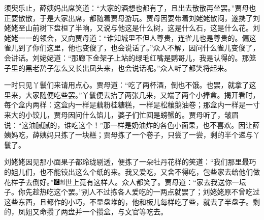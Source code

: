 须臾乐止，薛姨妈出席笑道：“大家的酒想也都有了，且出去散散再坐罢。”贾母也正要散散，于是大家出席，都随着贾母游玩。贾母因要带着刘姥姥散闷，遂携了刘姥姥至山前树下盘桓了半晌，又说与他这是什么树，这是什么石，这是什么花。刘姥姥一一的领会，又向贾母道：“谁知城里不但人尊贵，连雀儿也是尊贵的。偏这雀儿到了你们这里，他也变俊了，也会说话了。”众人不解，因问什么雀儿变俊了，会讲话。刘姥姥道：“那廊下金架子上站的绿毛红嘴是鹦哥儿，我是认得的。那笼子里的黑老鸹子怎么又长出凤头来，也会说话呢。”众人听了都笑将起来。

一时只见丫鬟们来请用点心。贾母道：“吃了两杯酒，倒也不饿。也罢，就拿了这里来，大家随便吃些罢。”丫鬟便去抬了两张几来，又端了两个小捧盒。揭开看时，每个盒内两样：这盒内一样是藕粉桂糖糕，一样是松穰鹅油卷；那盒内一样是一寸来大的小饺儿，贾母因问什么馅儿，婆子们忙回是螃蟹的。贾母听了，皱眉说：“这油腻腻的，谁吃这个！”那一样是奶油炸的各色小面果，也不喜欢。因让薛姨妈吃，薛姨妈只拣了一块糕；贾母拣了一个卷子，只尝了一尝，剩的半个递与丫鬟了。

刘姥姥因见那小面果子都玲珑剔透，便拣了一朵牡丹花样的笑道：“我们那里最巧的姐儿们，也不能铰出这么个纸的来。我又爱吃，又舍不得吃，包些家去给他们做花样子去倒好。”{\includegraphics[width=3mm]{../Images/00006}\includegraphics[width=3mm]{../Images/00011}\footnotesize \kaishu 世上竟有这样人。}众人都笑了。贾母道：“家去我送你一坛子。你先趁热吃这个罢。”别人不过拣各人爱吃的一两点就罢了；刘姥姥原不曾吃过这些东西，且都作的小巧，不显盘堆的，他和板儿每样吃了些，就去了半盘子。剩的，凤姐又命攒了两盘并一个攒盒，与文官等吃去。

